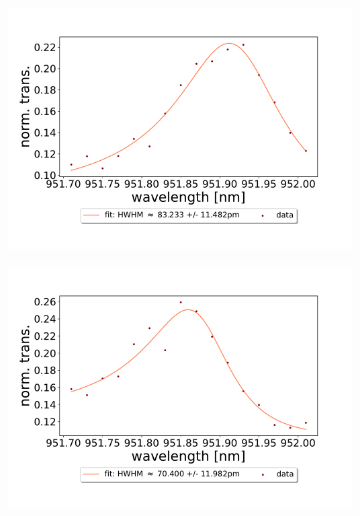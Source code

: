 \begin{figure}[h!]
    \centering
    \begin{subfigure}[b]{0.49\textwidth}
        \includegraphics[width=\textwidth]{figures/results/double fano fits/70um_M3:M5_fit_1.pdf}
        \caption{}
        \label{fig:70um_M3:M5_fit_1}
    \end{subfigure}
    \begin{subfigure}[b]{0.49\textwidth}
        \includegraphics[width=\textwidth]{figures/results/double fano fits/70um_M3:M5_fit_2.pdf}
        \caption{}
        \label{fig:70um_M3:M5_fit_2}
    \end{subfigure}
    \begin{subfigure}[b]{0.49\textwidth}

\end{subfigure}
\end{figure}
